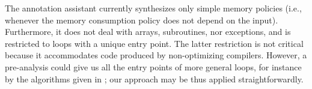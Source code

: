 


The annotation assistant currently synthesizes only simple memory
policies (i.e., whenever the memory consumption policy does not depend
on the input).  Furthermore, it does not deal with arrays,
subroutines, nor exceptions, and is restricted to loops with a unique
entry point. The latter restriction is not critical because it
accommodates code produced by non-optimizing compilers. However, a
pre-analysis could give us all the entry points of more general loops,
for instance by the algorithms given in \cite{CJPS05cmu}; our approach
may be thus applied straightforwardly. 




